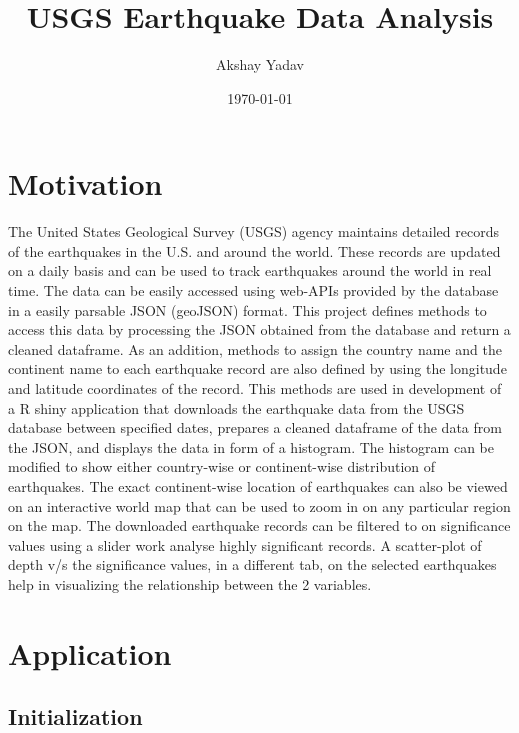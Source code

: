 \documentclass{article}
\title{USGS Earthquake Data Analysis}
\date{\today}
\author{Akshay Yadav}
\begin{document}
	\maketitle
	\section{Motivation}
		The United States Geological Survey (USGS) agency maintains detailed records of the earthquakes in the U.S. and around the world. These records are updated on a daily basis and can be used to track earthquakes around the world in real time. The data can be easily accessed using web-APIs provided by the database in a easily parsable JSON (geoJSON) format. This project defines methods to access this data by processing the JSON obtained from the database and return a cleaned dataframe. As an addition, methods to assign the country name and the continent name to each earthquake record are also defined by using the longitude and latitude coordinates of the record. This methods are used in development of a R shiny application that downloads the earthquake data from the USGS database between specified dates, prepares a cleaned dataframe of the data from the JSON, and displays the data in form of a histogram. The histogram can be modified to show either country-wise or continent-wise distribution of earthquakes. The exact continent-wise location of earthquakes can also be viewed on an interactive world map that can be used to zoom in on any particular region on the map. The downloaded earthquake records can be filtered to on significance values using a slider work analyse highly significant records. A scatter-plot of depth v/s the significance values, in a different tab, on the selected earthquakes help in visualizing the relationship between the 2 variables.
		
	\section{Application}
		\subsection{Initialization}
	
\end{document}
